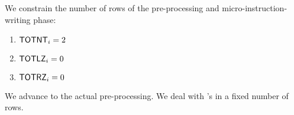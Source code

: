 \begin{center}
\end{center}
We constrain the number of rows of the pre-processing and micro-instruction-writing phase:
\begin{enumerate}
	\item $\textsf{TOTNT}_{i}  = 2$
	\item $\textsf{TOTLZ}_{i}  = 0$
	\item $\textsf{TOTRZ}_{i}  = 0$
\end{enumerate}
We advance to the actual pre-processing.
We deal with \mmuInstRightPaddedWordExtraction{}'s in a fixed number of rows.

